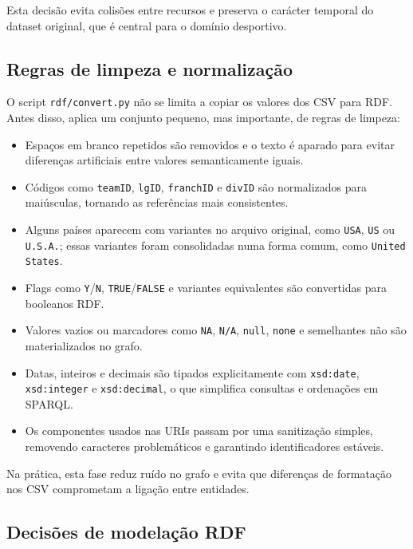 Esta decis\~ao evita colis\~oes entre recursos e preserva o car\'acter temporal do dataset original, que \'{e} central para o dom\'inio desportivo.

\subsection{Regras de limpeza e normaliza\c{c}\~ao}

O script \texttt{rdf/convert.py} n\~ao se limita a copiar os valores dos CSV para RDF. Antes disso, aplica um conjunto pequeno, mas importante, de regras de limpeza:

\begin{itemize}[leftmargin=*]
  \item Espa\c{c}os em branco repetidos s\~ao removidos e o texto \'{e} aparado para evitar diferen\c{c}as artificiais entre valores semanticamente iguais.
  \item C\'odigos como \texttt{teamID}, \texttt{lgID}, \texttt{franchID} e \texttt{divID} s\~ao normalizados para mai\'usculas, tornando as refer\^encias mais consistentes.
  \item Alguns pa\'ises aparecem com variantes no arquivo original, como \texttt{USA}, \texttt{US} ou \texttt{U.S.A.}; essas variantes foram consolidadas numa forma comum, como \texttt{United States}.
  \item Flags como \texttt{Y}/\texttt{N}, \texttt{TRUE}/\texttt{FALSE} e variantes equivalentes s\~ao convertidas para booleanos RDF.
  \item Valores vazios ou marcadores como \texttt{NA}, \texttt{N/A}, \texttt{null}, \texttt{none} e semelhantes n\~ao s\~ao materializados no grafo.
  \item Datas, inteiros e decimais s\~ao tipados explicitamente com \texttt{xsd:date}, \texttt{xsd:integer} e \texttt{xsd:decimal}, o que simplifica consultas e ordena\c{c}\~oes em SPARQL.
  \item Os componentes usados nas URIs passam por uma sanitiza\c{c}\~ao simples, removendo caracteres problem\'aticos e garantindo identificadores est\'aveis.
\end{itemize}

Na pr\'atica, esta fase reduz ru\'ido no grafo e evita que diferen\c{c}as de formata\c{c}\~ao nos CSV comprometam a liga\c{c}\~ao entre entidades.

\subsection{Decis\~oes de modela\c{c}\~ao RDF}

